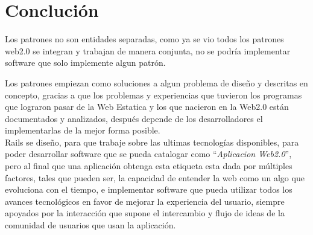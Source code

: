   \section{Concluci\'on} %
  \label{sec:conclucion}
    Los patrones no son entidades separadas, como ya se vio todos los patrones web2.0 
    se integran y trabajan de manera conjunta, no se podría implementar software que solo 
    implemente algun patr\'on.
    
    Los patrones empiezan como soluciones a algun problema de dise\~no y descritas en concepto, 
    gracias a que los problemas y experiencias que tuvieron los programas que lograron pasar de la
    Web Estatica  y los que nacieron en la Web2.0 están documentados y analizados,
    después depende de los desarrolladores el implementarlas de la mejor forma posible.\\

    Rails se dise\~no, para que trabaje sobre las ultimas tecnolog\'ias disponibles, para poder desarrollar 
    software que se pueda catalogar como ``\emph{Aplicacion Web2.0}'', pero al final que una aplicaci\'on
    obtenga esta etiqueta esta dada por m\'ultiples factores, tales que pueden ser,
    la capacidad de entender la web como un algo que evoluciona con el tiempo, e
    implementar software que pueda utilizar todos los avances tecnol\'ogicos en favor
    de mejorar la experiencia del usuario, siempre apoyados por la interacci\'on
    que supone el intercambio y flujo de ideas de la comunidad de usuarios que usan
    la aplicaci\'on.\\  
    
 



